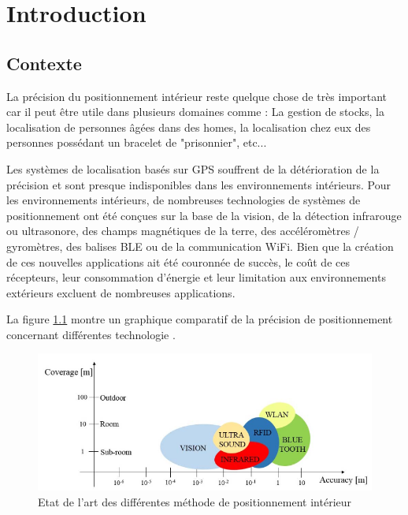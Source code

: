 \chapter{Introduction}

\section{Contexte}
La précision du positionnement intérieur reste quelque chose de très important car il peut être utile dans plusieurs domaines comme : La gestion de stocks, la localisation de personnes âgées dans des homes, la localisation chez eux des personnes possédant un bracelet de "prisonnier", etc...

Les systèmes de localisation basés sur GPS souffrent de la détérioration de la précision et sont presque indisponibles dans les environnements intérieurs. Pour les environnements intérieurs, de nombreuses technologies de systèmes de positionnement ont été conçues sur la base de la vision, de la détection infrarouge ou ultrasonore, des champs magnétiques de la terre, des accéléromètres / gyromètres, des balises BLE ou de la communication WiFi. Bien que la création de ces nouvelles applications ait été couronnée de succès, le coût de ces récepteurs, leur consommation d’énergie et leur limitation aux environnements extérieurs excluent de nombreuses applications.

La figure \ref{fig:MethodePos} montre un graphique comparatif de la précision de positionnement concernant différentes technologie \cite{INPOS}. 

\begin{figure}[htp]
	\begin{center}
		\includegraphics[scale=0.7]{figures/MethodePos.png}
		\caption{Etat de l'art des différentes méthode de positionnement intérieur \cite{INPOS}}
		\label{fig:MethodePos} %
	\end{center}
\end{figure}

